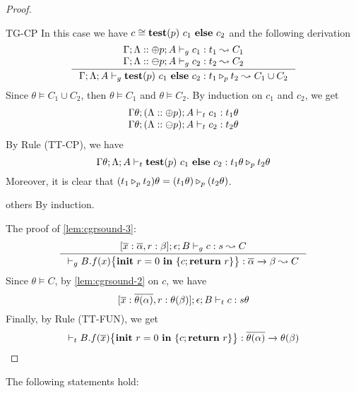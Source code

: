 {{{\begin{proof}
\begin{ProofEnumDesc}
\item[TG-CP] In this case we have $c \cong \lcCP{p}{c_1}{c_2}$ and the following derivation
\begin{equation*}
\inference
{
\Gamma;\trace::\tplus p; A \vdash_{g} c_1 : t_1  \leadsto C_1 \\
 \Gamma;\trace::\tminus p; A \vdash_{g} c_2 : t_2  \leadsto C_2
 }
{\Gamma;\trace; A \vdash_{g} \lcCP{p}{c_1}{c_2} : \omerge{p}{t_1}{t_2} \leadsto C_1\cup C_2}
\end{equation*}
Since $\theta \vDash C_1 \cup C_2$, then $\theta\vDash C_1$ and $\theta \vDash C_2$.
By induction on $c_1$ and $c_2$, we get
$$
\begin{array}{l}
\Gamma\theta;(\trace::\tplus p);  A \vdash_{t} c_1 : t_1\theta\\
\Gamma\theta;(\trace::\tminus p); A \vdash_{t} c_2 : t_2\theta
\end{array}
$$
By Rule {(TT-CP)}, we have
$$
\Gamma\theta;\trace; A \vdash_{t} \lcCP{p}{c_1}{c_2} : \omerge{p}{t_1\theta}{t_2\theta}
$$
Moreover, it is clear that $(\omerge{p}{t_1}{t_2})\theta = \omerge{p}{(t_1\theta)}{(t_2\theta)}$.

\item[others] By induction.
\end{ProofEnumDesc}
The proof of \ref{lem:cgrsound-3}:\\
\begin{equation*}
\inference
{
[\overline{x}: \overline{\alpha},\lpRES:\beta]; \epsilon; B \vdash_{g} c : s  \leadsto C \\
}
{
\vdash_{g} \lpPROG{B.f}{x}{c}{\lpRES} :  \overline{\alpha}\xrightarrow{} \beta  \leadsto  C
}
\end{equation*}
Since $\theta \vDash C$,  %
by \ref{lem:cgrsound-2} on $c$, we have
$$
[\overline{ x}: \overline{\theta(\alpha)},\lpRES:\theta(\beta)];\epsilon; B \vdash_{t} c : s\theta
$$
Finally, by Rule {(TT-FUN)}, we get
$$
\vdash_{t} \lpPROG{B.f}{\overline{x}}{c}{\lpRES} : \overline{\theta(\alpha)}\xrightarrow{} \theta(\beta)
$$
\end{proof}




\begin{lemma}\label{lem:cgrcomplete}
The following statements hold:
\begin{enumerate}[label={(\alph*)}]


\end{enumerate}
\end{lemma}}}}
